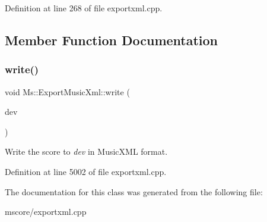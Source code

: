 Definition at line 268 of file exportxml.\+cpp.



\subsection{Member Function Documentation}
\mbox{\label{class_ms_1_1_export_music_xml_a7acf6ba93e814908c050a9d26bb2ad8b}} 
\subsubsection{\texorpdfstring{write()}{write()}}
{\footnotesize\ttfamily void Ms\+::\+Export\+Music\+Xml\+::write (\begin{DoxyParamCaption}\item[{Q\+I\+O\+Device $\ast$}]{dev }\end{DoxyParamCaption})}

Write the score to {\itshape dev} in Music\+X\+ML format. 

Definition at line 5002 of file exportxml.\+cpp.



The documentation for this class was generated from the following file\+:\begin{DoxyCompactItemize}
\item 
mscore/exportxml.\+cpp\end{DoxyCompactItemize}
